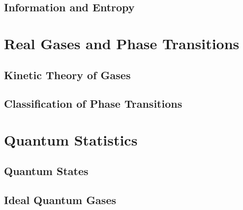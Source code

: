 \documentclass[12pt, a4paper, oneside, openright, titlepage]{book}
\begin{document}
\chapter{Information and Entropy}





\part{Real Gases and Phase Transitions}


\chapter{Kinetic Theory of Gases}



\chapter{Classification of Phase Transitions}






\part{Quantum Statistics}


\chapter{Quantum States}


\chapter{Ideal Quantum Gases}








\begin{appendices}


\end{appendices}
\end{document}
